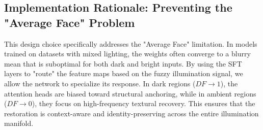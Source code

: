 \subsection{Implementation Rationale: Preventing the "Average Face" Problem}
This design choice specifically addresses the "Average Face" limitation. In models trained on datasets with mixed lighting, the weights often converge to a blurry mean that is suboptimal for both dark and bright inputs. By using the SFT layers to "route" the feature maps based on the fuzzy illumination signal, we allow the network to specialize its response. In dark regions ($DF \to 1$), the attention heads are biased toward structural anchoring, while in ambient regions ($DF \to 0$), they focus on high-frequency textural recovery. This ensures that the restoration is context-aware and identity-preserving across the entire illumination manifold.
